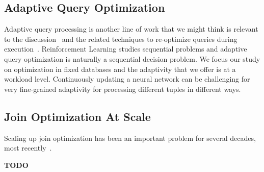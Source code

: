 \subsection{Adaptive Query Optimization}
Adaptive query processing is another line of work that we might think is relevant to the discussion~\cite{avnur2000eddies,deshpande2007adaptive} and the related techniques to re-optimize queries during execution~\cite{markl2004robust, babu2005proactive}. Reinforcement Learning studies sequential problems and adaptive query optimization is naturally a sequential decision problem.
We focus our study on optimization in fixed databases and the adaptivity that we offer is at a workload level. Continuously updating a neural network can be challenging for very fine-grained adaptivity for processing different tuples in different ways. 

\subsection{Join Optimization At Scale} 
Scaling up join optimization has been an important problem for several decades, most recently~\cite{neumann2018adaptive}. 

\textbf{TODO}







 


